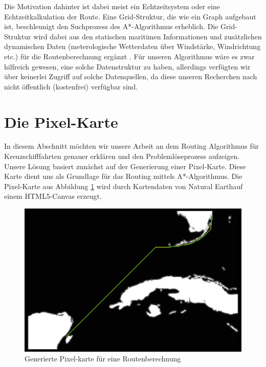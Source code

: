 \documentclass[letterpaper]{article}
\begin{document}
	Die Motivation dahinter ist dabei meist ein Echtzeitsystem oder eine Echtzeitkalkulation der Route. Eine Grid-Struktur, die wie ein Graph aufgebaut ist, beschleunigt den Suchprozess des A*-Algorithmus erheblich\cite{patel16}. Die Grid-Struktur wird dabei aus den statischen maritimen Informationen und zusätzlichen dynamischen Daten (meterologische Wetterdaten über Windstärke, Windrichtung etc.) für die Routenberechnung ergänzt \cite[s. 2]{makrygiorgos15}.
	Für unseren Algorithmus wäre es zwar hilfreich gewesen, eine solche Datenstruktur zu haben, allerdings verfügten wir über keinerlei Zugriff auf solche Datenquellen, da diese unseren Recherchen nach nicht öffentlich (kostenfrei) verfügbar sind.

\section{Die Pixel-Karte}
	In diesem Abschnitt möchten wir unsere Arbeit an dem Routing Algorithmus für Kreuzschifffahrten genauer erklären und den Problemlöseprozess aufzeigen. Unsere Lösung basiert zunächst auf der Generierung einer Pixel-Karte. Diese Karte dient uns als Grundlage für das Routing mittels A*-Algorithmus. Die Pixel-Karte aus Abbildung \ref{fig:Pixel Map Miami} wird durch Kartendaten von Natural Earth\footnotemark auf einem HTML5-Canvas erzeugt. 


	\begin{figure}[!htbp]
		\centering
		\includegraphics[width=\linewidth]{pixel_map_miami}
		\caption{Generierte Pixel-karte für eine Routenberechnung}
		\label{fig:Pixel Map Miami}
	\end{figure}
\end{document}
